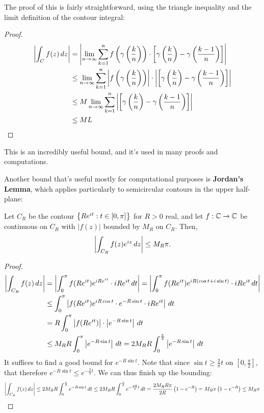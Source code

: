 The proof of this is fairly straightforward, using the triangle inequality and the limit definition of the contour integral:
\begin{proof}
  \begin{align*}
    \left\lvert \int_C f(z) \, dz \right\rvert
     & = \left\lvert  \lim_{n\to \infty} \sum_{k=1}^n f \left(\gamma\left(\frac k n \right)\right)  \cdot \left[\gamma \left(\frac k n\right) - \gamma\left(\frac{k-1} n \right) \right]  \right\rvert           \\
     & \leq  \lim_{n\to \infty} \sum_{k=1}^n \left\lvert  f \left(\gamma\left(\frac k n \right)\right) \right\rvert  \cdot \left\lvert \left[\gamma \left(\frac k n\right) - \gamma\left(\frac{k-1} n \right) \right]  \right\rvert \\
     & \leq M \lim_{n\to \infty} \sum_{k=1}^n \left\lvert \left[\gamma \left(\frac k n\right) - \gamma\left(\frac{k-1} n \right) \right]  \right\rvert                                                           \\
     & \leq M L
  \end{align*}
\end{proof}
This is an incredibly useful bound, and it's used in many proofs and computations.

Another bound that's useful mostly for computational purposes is \textbf{Jordan's Lemma}, which applies particularly to semicircular contours in the upper half-plane:
\begin{theorem}
  Let $C_R$ be the contour $\left\{ R e^{it} : t \in [0, \pi] \right\}$ for $R > 0$ real, and let $f : \mathbb C \to \mathbb C$ be continuous on $C_R$ with $|f(z)|$ bounded by $M_R$ on $C_R$. Then, \[ \left\lvert \int_{C_R} f(z) e^{iz} \, dz \right\rvert \leq M_R \pi  .\]
\end{theorem}
\begin{proof}
  \begin{align*}
    \left\lvert \int_{C_R} f(z) \, dz \right\rvert
     & = \left\lvert \int_0^\pi f(Re^{it}) e^{i Re^{it}} \cdot iR e^{it} \, dt \right\rvert = \left\lvert \int_0^\pi f(Re^{it}) e^{i R(\cos t + i \sin t)} \cdot iR e^{it} \, dt \right\rvert \\
     & \leq \int_0^\pi \left\lvert f(Re^{it}) e^{i R\cos t} \cdot e^{-R \sin t} \cdot iR e^{it} \right\rvert \, dt                                                         \\
     & = R \int_0^\pi \left\lvert f(Re^{it}) \right\rvert  \cdot \left\lvert e^{-R \sin t} \right\rvert \, dt                                                                                 \\
     & \leq M_R R \int_0^\pi \left\lvert e^{-R \sin t} \right\rvert \, dt = 2M_R R \int_0^{\frac \pi 2} \left\lvert e^{-R \sin t} \right\rvert \, dt
  \end{align*}
  It suffices to find a good bound for $e^{-R \sin t}$. Note that since $\sin t \geq \frac 2 \pi t$ on $[0, \frac \pi 2]$, that therefore $e^{-R \sin t} \leq e^{-\frac 2 \pi t}$. We can thus finish up the bounding:
  \begin{align*}
    \left\lvert \int_{C_R} f(z) \, dz \right\rvert \leq 2M_R R \int_0^{\frac \pi 2} e^{-R \sin t} \, dt \leq 2 M_R R \int_0^{\frac \pi 2} e^{-\frac{2R}{\pi} t} \, dt = \frac{2 M_R R \pi}{2R} \left( 1 - e^{-R} \right) = M_R \pi \left( 1 - e^{-R} \right) \leq M_R \pi \\
  \end{align*}
\end{proof}



